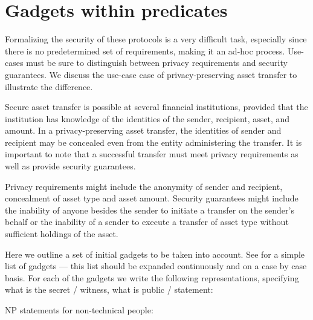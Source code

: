 \section{Gadgets within predicates}
\label{apps:gadgets-within-predicates}


	Formalizing the security of these protocols is a very difficult task, especially since there is no predetermined set of requirements, making it an ad-hoc process.
	Use-cases must be sure to distinguish between privacy requirements and security guarantees.
	We discuss the use-case case of privacy-preserving asset transfer to illustrate the difference.

	Secure asset transfer is possible at several financial institutions, provided that the institution has knowledge of the identities of the sender, recipient, asset, and amount.
	In a privacy-preserving asset transfer, the identities of sender and recipient may be concealed even from the entity administering the transfer.
	It is important to note that a successful transfer must meet privacy requirements as well as provide security guarantees.

	Privacy requirements might include the anonymity of sender and recipient, concealment of asset type and asset amount.
	Security guarantees might include the inability of anyone besides the sender to initiate a transfer on the sender's behalf or the inability of a sender to execute a transfer of asset type without sufficient holdings of the asset. 


	Here we outline a set of initial gadgets to be taken into account.%
See  for a simple list of gadgets --- this list should be expanded continuously and on a case by case basis.
	For each of the gadgets %
we write the following representations, specifying what is the secret / witness, what is public / statement:

NP statements for non-technical people:

